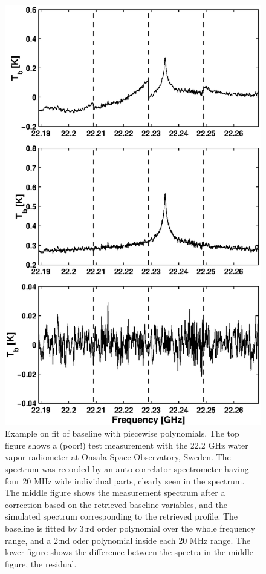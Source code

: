  \begin{figure}[t]
  \begin{center}
   \includegraphics*[width=0.72\hsize]{Figs/fig_baselinefit.eps}
   \caption{Example on fit of baseline with piecewise polynomials.
     The top figure shows a (poor!) test measurement with the 22.2 GHz
     water vapor radiometer at Onsala Space Observatory, Sweden.  The
     spectrum was recorded by an auto-correlator spectrometer having
     four 20 MHz wide individual parts, clearly seen in the spectrum.
     The middle figure shows the measurement spectrum after a
     correction based on the retrieved baseline variables, and the
     simulated spectrum corresponding to the retrieved profile. The
     baseline is fitted by 3:rd order polynomial over the whole
     frequency range, and a 2:nd oder polynomial inside each 20 MHz
     range. The lower figure shows the difference between the spectra
     in the middle figure, the residual.}
   \label{fig:wfuns:baselinefit}
  \end{center}
 \end{figure}




